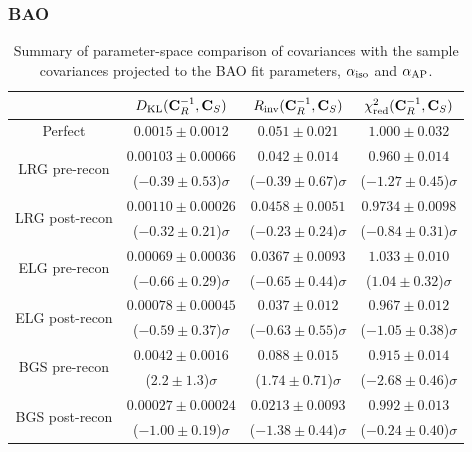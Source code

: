 \subsubsection{BAO}
\label{sec:cov-comparison-bao-param}

\begin{table}[tb]
\centering
\begin{tabular}{|c|c|c|c|}
\hline
 & $D_{\rm KL} ({\bf C}_R^{-1}, {\bf C}_S)$ & $R_{\rm inv} ({\bf C}_R^{-1}, {\bf C}_S)$ & $\chi^2_{\rm red} ({\bf C}_R^{-1}, {\bf C}_S)$ \\
\hline
Perfect & $0.0015 \pm 0.0012$ & $0.051 \pm 0.021$ & $1.000 \pm 0.032$ \\
\hline
\multirow{2}{*}{LRG pre-recon} & $0.00103 \pm 0.00066$ & $0.042 \pm 0.014$ & $0.960 \pm 0.014$ \\
 & ($-0.39 \pm 0.53$)$\sigma$ & ($-0.39 \pm 0.67$)$\sigma$ & ($-1.27 \pm 0.45$)$\sigma$ \\
\hline
\multirow{2}{*}{LRG post-recon} & $0.00110 \pm 0.00026$ & $0.0458 \pm 0.0051$ & $0.9734 \pm 0.0098$ \\
 & ($-0.32 \pm 0.21$)$\sigma$ & ($-0.23 \pm 0.24$)$\sigma$ & ($-0.84 \pm 0.31$)$\sigma$ \\
\hline
\multirow{2}{*}{ELG pre-recon} & $0.00069 \pm 0.00036$ & $0.0367 \pm 0.0093$ & $1.033 \pm 0.010$ \\
 & ($-0.66 \pm 0.29$)$\sigma$ & ($-0.65 \pm 0.44$)$\sigma$ & ($1.04 \pm 0.32$)$\sigma$ \\
\hline
\multirow{2}{*}{ELG post-recon} & $0.00078 \pm 0.00045$ & $0.037 \pm 0.012$ & $0.967 \pm 0.012$ \\
 & ($-0.59 \pm 0.37$)$\sigma$ & ($-0.63 \pm 0.55$)$\sigma$ & ($-1.05 \pm 0.38$)$\sigma$ \\
\hline
\multirow{2}{*}{BGS pre-recon} & $0.0042 \pm 0.0016$ & $0.088 \pm 0.015$ & $0.915 \pm 0.014$ \\
 & ($2.2 \pm 1.3$)$\sigma$ & ($1.74 \pm 0.71$)$\sigma$ & ($-2.68 \pm 0.46$)$\sigma$ \\
\hline
\multirow{2}{*}{BGS post-recon} & $0.00027 \pm 0.00024$ & $0.0213 \pm 0.0093$ & $0.992 \pm 0.013$ \\
 & ($-1.00 \pm 0.19$)$\sigma$ & ($-1.38 \pm 0.44$)$\sigma$ & ($-0.24 \pm 0.40$)$\sigma$ \\
\hline
\end{tabular}
\caption[Parameter-space comparison of \rascalc{} covariances with the \desimock{} sample covariances projected to the BAO fit parameters]{Summary of parameter-space comparison of \rascalc{} covariances with the sample covariances projected to the BAO fit parameters, ${\alpha_{\rm iso}}$ and ${\alpha_{\rm AP}}$.}
\label{tab:cov-comparison-BAO-parameters}
\end{table}

